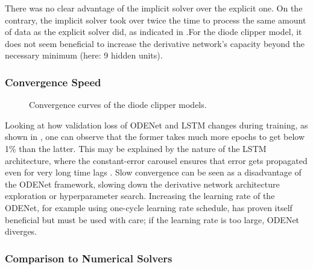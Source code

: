 There was no clear advantage of the implicit solver over the explicit one. On the contrary, the implicit solver took over twice the time to process the same amount of data as the explicit solver did, as indicated in .For the diode clipper model, it does not seem beneficial to increase the derivative network's capacity beyond the necessary minimum (here: 9 hidden units). 

\subsubsection{Convergence Speed}

\begin{figure}
    \centering
    
    \caption{Convergence curves of the diode clipper models.}
    \label{fig:diode_clipper_validation_curves}
\end{figure}

Looking at how validation loss of ODENet and LSTM changes during training, as shown in , one can observe that the former takes much more epochs to get below 1\% than the latter. This may be explained by the nature of the \ac{LSTM} architecture, where the constant-error carousel ensures that error gets propagated even for very long time lags \cite{Hochreiter1997}. Slow convergence can be seen as a disadvantage of the ODENet framework, slowing down the derivative network architecture exploration or hyperparameter search. Increasing the learning rate of the ODENet, for example using one-cycle learning rate schedule, has proven itself beneficial but must be used with care; if the learning rate is too large, ODENet diverges.

\subsubsection{Comparison to Numerical Solvers}


